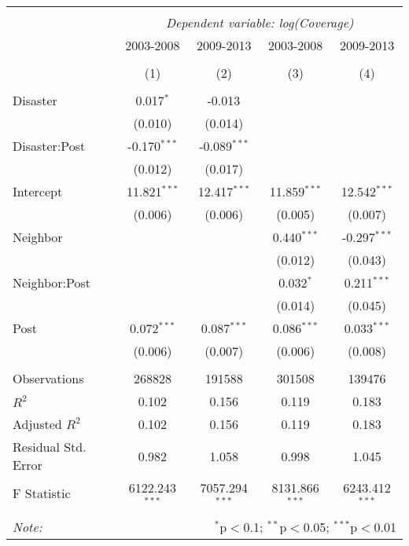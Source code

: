 
\begin{tabular}{@{\extracolsep{5pt}}lcccc}
\\[-1.8ex]\hline
\hline \\[-1.8ex]
& \multicolumn{4}{c}{\textit{Dependent variable: log(Coverage)}} \
\cr \cline{2-5}
\\[-1.8ex] & \multicolumn{1}{c}{2003-2008} & \multicolumn{1}{c}{2009-2013} & \multicolumn{1}{c}{2003-2008} & \multicolumn{1}{c}{2009-2013}  \\
\\[-1.8ex] & (1) & (2) & (3) & (4) \\
\hline \\[-1.8ex]
 Disaster & 0.017$^{*}$ & -0.013$^{}$ & & \\
& (0.010) & (0.014) & & \\
 Disaster:Post & -0.170$^{***}$ & -0.089$^{***}$ & & \\
& (0.012) & (0.017) & & \\
 Intercept & 11.821$^{***}$ & 12.417$^{***}$ & 11.859$^{***}$ & 12.542$^{***}$ \\
& (0.006) & (0.006) & (0.005) & (0.007) \\
 Neighbor & & & 0.440$^{***}$ & -0.297$^{***}$ \\
& & & (0.012) & (0.043) \\
 Neighbor:Post & & & 0.032$^{*}$ & 0.211$^{***}$ \\
& & & (0.014) & (0.045) \\
 Post & 0.072$^{***}$ & 0.087$^{***}$ & 0.086$^{***}$ & 0.033$^{***}$ \\
& (0.006) & (0.007) & (0.006) & (0.008) \\
\hline \\[-1.8ex]
 Observations & 268828 & 191588 & 301508 & 139476 \\
 $R^2$ & 0.102 & 0.156 & 0.119 & 0.183 \\
 Adjusted $R^2$ & 0.102 & 0.156 & 0.119 & 0.183 \\
 Residual Std. Error & 0.982  & 1.058  & 0.998  & 1.045  \\
 F Statistic & 6122.243$^{***}$  & 7057.294$^{***}$  & 8131.866$^{***}$  & 6243.412$^{***}$  \\
\hline
\hline \\[-1.8ex]
\textit{Note:} & \multicolumn{4}{r}{$^{*}$p$<$0.1; $^{**}$p$<$0.05; $^{***}$p$<$0.01} \\
\end{tabular}
